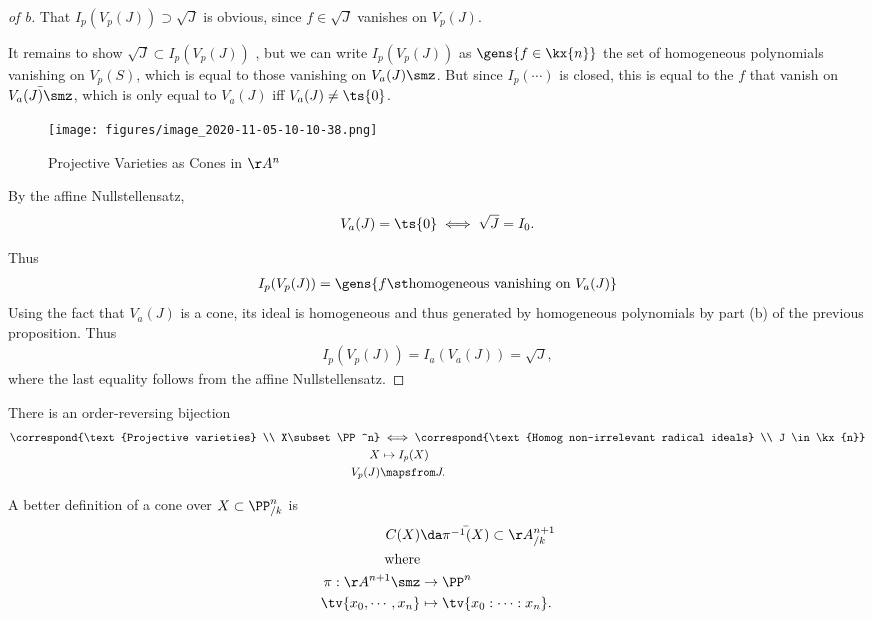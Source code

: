 \begin{proof}[of b]

That \(I_p(V_p(J)) \supset \sqrt J\) is obvious, since \(f\in \sqrt{J}\)
vanishes on \(V_p(J)\). 

It remains to show \(\sqrt{J} \subset I_p(V_p(J))\) , but we can write
\(I_p(V_p(J))\) as \(\gens{f \in \kx{n}}\) the set of homogeneous
polynomials vanishing on \(V_p(S)\), which is equal to those vanishing
on \(V_a(J) \smz\). But since \(I_p(\cdots)\) is closed, this is equal
to the \(f\) that vanish on \(\bar{V_a(J)\smz}\), which is only equal to
\(V_a(J)\) iff \(V_a(J) \neq \ts{0}\).

\begin{figure}
\centering
\texttt{[image: figures/image\_2020-11-05-10-10-38.png]}
\caption{Projective Varieties as Cones in \(\AA^n\)}
\end{figure}

By the affine Nullstellensatz,
\begin{align*}  
V_a(J) = \ts{0} \iff \sqrt{J} = I_0
.\end{align*}

Thus
\begin{align*}
I_p(V_p(J)) = \gens{f \st \text{homogeneous vanishing on }V_a(J)}
\end{align*} Using the fact that \(V_a(J)\) is a cone, its ideal is
homogeneous and thus generated by homogeneous polynomials by part (b) of
the previous proposition. Thus
\begin{align*}  
I_p(V_p(J)) = I_a(V_a(J)) = \sqrt J
,\end{align*} where the last equality follows from the affine
Nullstellensatz.

\end{proof}

\begin{corollary}[?]

There is an order-reversing bijection
\begin{align*}  
\correspond{\text{Projective varieties} \\ X\subset \PP^n}
&\iff
\correspond{\text{Homog non-irrelevant radical ideals} \\ J \in \kx{n}} \\
X &\mapsto I_p(X) \\
V_p(J) &\mapsfrom J
.\end{align*}

\end{corollary}

\begin{remark}

A better definition of a cone over \(X\subset \PP^n_{/k}\) is
\begin{align*}  
C(X) &\da \bar{\pi^{-1}(X)} \subset \AA^{n+1}_{/k} \\
\text{where} \\
\pi: \AA^{n+1}\smz &\to \PP^n \\
\tv{x_0, \cdots, x_n} &\mapsto \tv{x_0: \cdots: x_n}
.\end{align*}

\end{remark}

